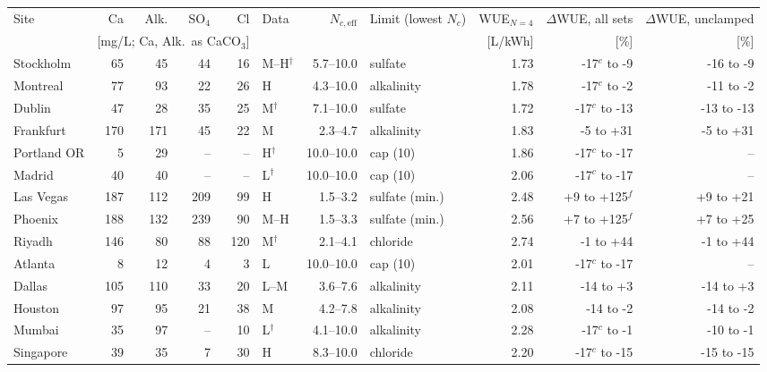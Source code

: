 \begin{tabular}{lrrrrlrlrrr}
\toprule
Site & Ca & Alk. & SO$_4$ & Cl & Data & $N_{c,\mathrm{eff}}$ & Limit (lowest $N_c$) & WUE$_{N=4}$ & $\Delta$WUE, all sets & $\Delta$WUE, unclamped \\
 & \multicolumn{4}{c}{[mg/L; Ca, Alk.\ as CaCO$_3$]} & & & & [L/kWh] & [\%] & [\%] \\
\midrule
Stockholm & 65 & 45 & 44 & 16 & M--H$^\dagger$ & 5.7--10.0 & sulfate & 1.73 & -17$^c$ to -9 & -16 to -9 \\
Montreal & 77 & 93 & 22 & 26 & H & 4.3--10.0 & alkalinity & 1.78 & -17$^c$ to -2 & -11 to -2 \\
Dublin & 47 & 28 & 35 & 25 & M$^\dagger$ & 7.1--10.0 & sulfate & 1.72 & -17$^c$ to -13 & -13 to -13 \\
Frankfurt & 170 & 171 & 45 & 22 & M & 2.3--4.7 & alkalinity & 1.83 & -5 to +31 & -5 to +31 \\
Portland OR & 5 & 29 & -- & -- & H$^\dagger$ & 10.0--10.0 & cap (10) & 1.86 & -17$^c$ to -17 & -- \\
Madrid & 40 & 40 & -- & -- & L$^\dagger$ & 10.0--10.0 & cap (10) & 2.06 & -17$^c$ to -17 & -- \\
Las Vegas & 187 & 112 & 209 & 99 & H & 1.5--3.2 & sulfate (min.) & 2.48 & +9 to +125$^f$ & +9 to +21 \\
Phoenix & 188 & 132 & 239 & 90 & M--H & 1.5--3.3 & sulfate (min.) & 2.56 & +7 to +125$^f$ & +7 to +25 \\
Riyadh & 146 & 80 & 88 & 120 & M$^\dagger$ & 2.1--4.1 & chloride & 2.74 & -1 to +44 & -1 to +44 \\
Atlanta & 8 & 12 & 4 & 3 & L & 10.0--10.0 & cap (10) & 2.01 & -17$^c$ to -17 & -- \\
Dallas & 105 & 110 & 33 & 20 & L--M & 3.6--7.6 & alkalinity & 2.11 & -14 to +3 & -14 to +3 \\
Houston & 97 & 95 & 21 & 38 & M & 4.2--7.8 & alkalinity & 2.08 & -14 to -2 & -14 to -2 \\
Mumbai & 35 & 97 & -- & 10 & L$^\dagger$ & 4.1--10.0 & alkalinity & 2.28 & -17$^c$ to -1 & -10 to -1 \\
Singapore & 39 & 35 & 7 & 30 & H & 8.3--10.0 & chloride & 2.20 & -17$^c$ to -15 & -15 to -15 \\
\bottomrule
\end{tabular}
